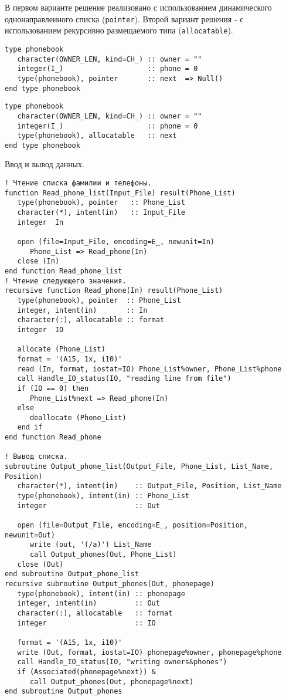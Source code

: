 \documentclass[a4paper,14pt]{article}
\begin{document}
В первом варианте решение реализовано с использованием динамического однонаправленного списка (\texttt{pointer}). 
Второй вариант решения - с использованием рекурсивно размещаемого типа (\texttt{allocatable}).

\begin{lstlisting}[caption={Динамический список, объявленный через pointer}]
type phonebook
   character(OWNER_LEN, kind=CH_) :: owner = ""
   integer(I_)                    :: phone = 0
   type(phonebook), pointer       :: next  => Null()
end type phonebook
\end{lstlisting}

\begin{lstlisting}[caption={Динамический список, объявленный через allocatable}]
type phonebook
   character(OWNER_LEN, kind=CH_) :: owner = ""
   integer(I_)                    :: phone = 0
   type(phonebook), allocatable   :: next
end type phonebook
\end{lstlisting}

Ввод и вывод данных.

\begin{lstlisting}[caption={Чтение и вывод данных (динамический однонаправленный список)}]
! Чтение списка фамилии и телефоны.
function Read_phone_list(Input_File) result(Phone_List)
   type(phonebook), pointer   :: Phone_List
   character(*), intent(in)   :: Input_File
   integer  In

   open (file=Input_File, encoding=E_, newunit=In)
      Phone_List => Read_phone(In)
   close (In)
end function Read_phone_list
! Чтение следующего значения.
recursive function Read_phone(In) result(Phone_List)
   type(phonebook), pointer  :: Phone_List
   integer, intent(in)       :: In
   character(:), allocatable :: format
   integer  IO
   
   allocate (Phone_List)
   format = '(A15, 1x, i10)'
   read (In, format, iostat=IO) Phone_List%owner, Phone_List%phone
   call Handle_IO_status(IO, "reading line from file")
   if (IO == 0) then
      Phone_List%next => Read_phone(In)
   else
      deallocate (Phone_List)
   end if
end function Read_phone

! Вывод списка.
subroutine Output_phone_list(Output_File, Phone_List, List_Name, Position)
   character(*), intent(in)    :: Output_File, Position, List_Name
   type(phonebook), intent(in) :: Phone_List
   integer                     :: Out
   
   open (file=Output_File, encoding=E_, position=Position, newunit=Out)
      write (out, '(/a)') List_Name
      call Output_phones(Out, Phone_List)
   close (Out)
end subroutine Output_phone_list
recursive subroutine Output_phones(Out, phonepage)
   type(phonebook), intent(in) :: phonepage
   integer, intent(in)         :: Out
   character(:), allocatable   :: format
   integer                     :: IO
   
   format = '(A15, 1x, i10)'
   write (Out, format, iostat=IO) phonepage%owner, phonepage%phone
   call Handle_IO_status(IO, "writing owners&phones")
   if (Associated(phonepage%next)) &
      call Output_phones(Out, phonepage%next)
end subroutine Output_phones
\end{lstlisting}
\end{document}
